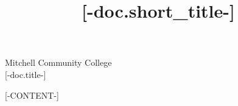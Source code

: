 \documentclass[draft]{article}
[# else #]
\title{[-doc.short_title-]}
\begin{document}
\begin{center}
    {\huge Mitchell Community College} \\[6pt]
    {\large [-doc.title-]}
\end{center}
[-CONTENT-]
\end{document}
